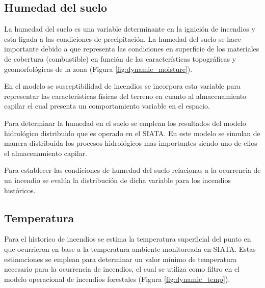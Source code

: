 \subsection*{Humedad del suelo}

La humedad del suelo es una variable determinante en la ignición de incendios y esta ligada a las condiciones de precipitación. La humedad del suelo se hace importante debido a que representa las condiciones en superficie de los materiales de cobertura (combustible) en función de las características topográficas y geomorfológicas de la zona (Figura \ref{fig:dynamic_moisture}). 

En el modelo se susceptibilidad de incendios se incorpora esta variable para representar las características físicas del terreno en cuanto al almacenamiento capilar el cual presenta un comportamiento variable en el espacio.

Para determinar la humedad en el suelo se emplean los resultados del modelo hidrológico distribuido que es operado en el SIATA. En este modelo se simulan de manera distribuida los procesos hidrológicos mas importantes siendo uno de ellos el almacenamiento capilar. 

Para establecer las condiciones de humedad del suelo relacionas a la ocurrencia de un incendio se evalúa la distribución de dicha variable para los incendios históricos.

\subsection*{Temperatura}

Para el historico de incendios se estima la temperatura superficial del punto en que ocurrieron en base a la temperatura ambiente monitoreada en SIATA. Estas estimaciones se emplean para determinar un valor mínimo de temperatura necesario para la ocurrencia de incendios, el cual se utiliza como filtro en el modelo operacional de incendios forestales (Figura \ref{fig:dynamic_temp}).

